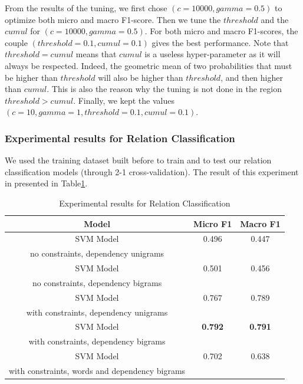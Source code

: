\documentclass[12pt]{article}
\begin{document}
From the results of the tuning, we first chose $(c=10000, gamma=0.5)$ to optimize both micro and macro F1-score.
Then we tune the $threshold$ and the $cumul$ for $(c=10000, gamma=0.5)$. For both micro and macro F1-scores, the couple $(threshold=0.1, cumul=0.1)$ gives the best performance. Note that $threshold=cumul$ means that $cumul$ is a useless hyper-parameter as it will always be respected. Indeed, the geometric mean of two probabilities that must be higher than $threshold$ will also be higher than $threshold$, and then higher than $cumul$. This is also the reason why the tuning is not done in the region $threshold > cumul$. Finally, we kept the values $(c=10, gamma=1, threshold=0.1, cumul=0.1)$.\\

\subsubsection{Experimental results for Relation Classification}

We used the training dataset built before to train and to test our relation classification models (through 2-1 cross-validation). The result of this experiment in presented in Table\ref{resultsRelationClassification}.

\begin{table}[!ht]
\center
\begin{tabular}{c||c|c}
	Model & Micro F1 & Macro F1 \\
	\hline
	\hline
	SVM Model & 0.496 & 0.447 \\
	no constraints, dependency unigrams & & \\ \hline
	SVM Model & 0.501 & 0.456 \\
	no constraints, dependency bigrams & & \\ \hline
	SVM Model & 0.767 & 0.789 \\
	with constraints, dependency unigrams & & \\ \hline
	SVM Model & \textbf{0.792} & \textbf{0.791} \\
	with constraints, dependency bigrams & & \\ \hline
	SVM Model & 0.702 & 0.638 \\
	with constraints, words and dependency bigrams & & \\ \hline
\end{tabular}
\caption{\label{resultsRelationClassification} Experimental results for Relation Classification}
\end{table}
\end{document}
